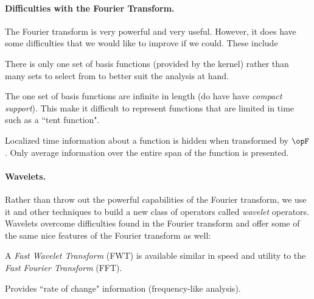 \paragraph{Difficulties with the Fourier Transform.}
The Fourier transform is very powerful and very useful.
However, it does have some difficulties that we would like to
improve if we could. These include
\begin{enume}
  \item There is only one set of basis functions (provided by the kernel)
        rather than
        many sets to select from to better suit the analysis at hand.
  \item The one set of basis functions
        are infinite in length (do have have {\em compact support}).
        This make it difficult to represent functions that are limited in time
        such as a ``tent function".
  \item Localized time information about a function is hidden when
        transformed by $\opF$. Only average information over the entire
        span of the function is presented.
\end{enume}

\paragraph{Wavelets.}
Rather than throw out the powerful capabilities of the Fourier transform,
we use it and other techniques to build a new class of operators called
{\em wavelet} operators.
Wavelets overcome difficulties found in the Fourier transform
and offer some of the same nice features of the Fourier transform as well:
\begin{enume}
  \item A {\em Fast Wavelet Transform} (FWT) is available similar in speed
        and utility to the {\em Fast Fourier Transform} (FFT).
  \item Provides ``rate of change" information (frequency-like analysis).
\end{enume}


